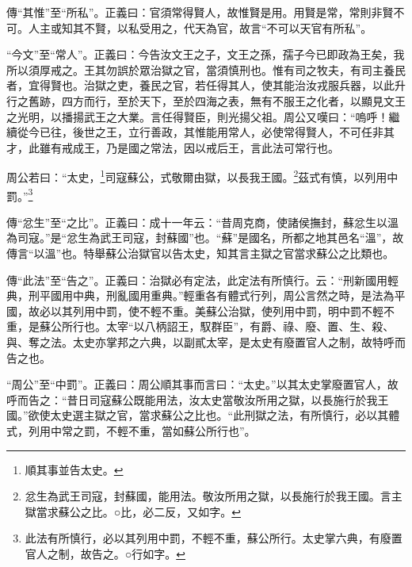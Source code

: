 {\noindent\zhuan{}\fzbyks 傳“其惟”至“所私”。正義曰：官須常得賢人，故惟賢是用。用賢是常，常則非賢不可。人主或知其不賢，以私受用之，代天為官，故言“不可以天官有所私”。 \par}

{\noindent\shu{}\fzkt “今文”至“常人”。正義曰：今告汝文王之子，文王之孫，孺子今已即政為王矣，我所以須厚戒之。王其勿誤於眾治獄之官，當須慎刑也。惟有司之牧夫，有司主養民者，宜得賢也。治獄之吏，養民之官，若任得其人，使其能治汝戎服兵器，以此升行之舊跡，四方而行，至於天下，至於四海之表，無有不服王之化者，以顯見文王之光明，以播揚武王之大業。言任得賢臣，則光揚父祖。周公又嘆曰：“嗚呼！繼續從今已往，後世之王，立行善政，其惟能用常人，必使常得賢人，不可任非其才，此雖有戒成王，乃是國之常法，因以戒后王，言此法可常行也。 \par}

周公若曰：“太史，\footnote{順其事並告太史。}司寇蘇公，式敬爾由獄，以長我王國。\footnote{忿生為武王司寇，封蘇國，能用法。敬汝所用之獄，以長施行於我王國。言主獄當求蘇公之比。○比，必二反，又如字。}茲式有慎，以列用中罰。”\footnote{此法有所慎行，必以其列用中罰，不輕不重，蘇公所行。太史掌六典，有廢置官人之制，故告之。○行如字。}


{\noindent\zhuan{}\fzbyks 傳“忿生”至“之比”。正義曰：成十一年云：“昔周克商，使諸侯撫封，蘇忿生以溫為司寇。”是“忿生為武王司寇，封蘇國”也。“蘇”是國名，所都之地其邑名“溫”，故傳言“以溫”也。特舉蘇公治獄官以告太史，知其言主獄之官當求蘇公之比類也。 \par}

{\noindent\zhuan{}\fzbyks 傳“此法”至“告之”。正義曰：治獄必有定法，此定法有所慎行。云：“刑新國用輕典，刑平國用中典，刑亂國用重典。”輕重各有體式行列，周公言然之時，是法為平國，故必以其列用中罰，使不輕不重。美蘇公治獄，使列用中罰，明中罰不輕不重，是蘇公所行也。太宰“以八柄詔王，馭群臣”，有爵、祿、廢、置、生、殺、與、奪之法。太史亦掌邦之六典，以副貳太宰，是太史有廢置官人之制，故特呼而告之也。 \par}

{\noindent\shu{}\fzkt “周公”至“中罰”。正義曰：周公順其事而言曰：“太史。”以其太史掌廢置官人，故呼而告之：“昔日司寇蘇公既能用法，汝太史當敬汝所用之獄，以長施行於我王國。”欲使太史選主獄之官，當求蘇公之比也。“此刑獄之法，有所慎行，必以其體式，列用中常之罰，不輕不重，當如蘇公所行也”。 \par}

